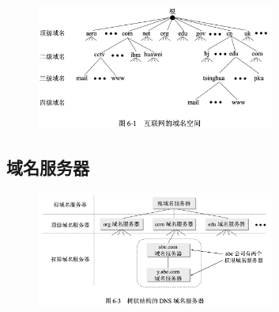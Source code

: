 \documentclass[cs4size,a4paper,10pt]{ctexart}
\begin{document}
	\begin{figure}[H]
		\centering
		\includegraphics[width=0.7\textwidth]{img/6.1}
	\end{figure}

	\subsection{域名服务器}

	\begin{figure}[H]
		\centering
		\includegraphics[width=0.7\textwidth]{img/6.3}
	\end{figure}
\end{document}
